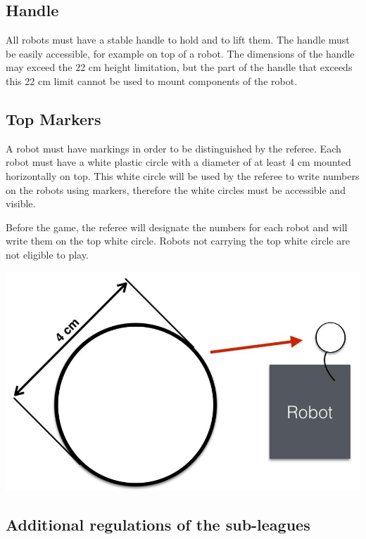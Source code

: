 \documentclass{article}
\begin{document}
\subsection{ Handle \label{ref-024}}

All robots must have a stable handle to hold and to lift them. The handle must be easily accessible, for example on top of a robot. The dimensions of the handle may exceed the 22 cm height limitation, but the part of the handle that exceeds this 22 cm limit cannot be used to mount components of the robot.

\subsection{ Top Markers\label{ref-025}}

A robot must have markings in order to be distinguished by the referee. Each robot must have a white plastic circle with a diameter of at least 4 cm mounted horizontally on top. This white circle will be used by the referee to write numbers on the robots using markers, therefore the white circles must be accessible and visible.

Before the game, the referee will designate the numbers for each robot and will write them on the top white circle. Robots not carrying the top white circle are not eligible to play.

\includegraphics[width=1\textwidth]{media/image4.jpeg}

\textbf{}

\subsection{ Additional regulations of the sub-leagues \label{ref-026}}
\end{document}
